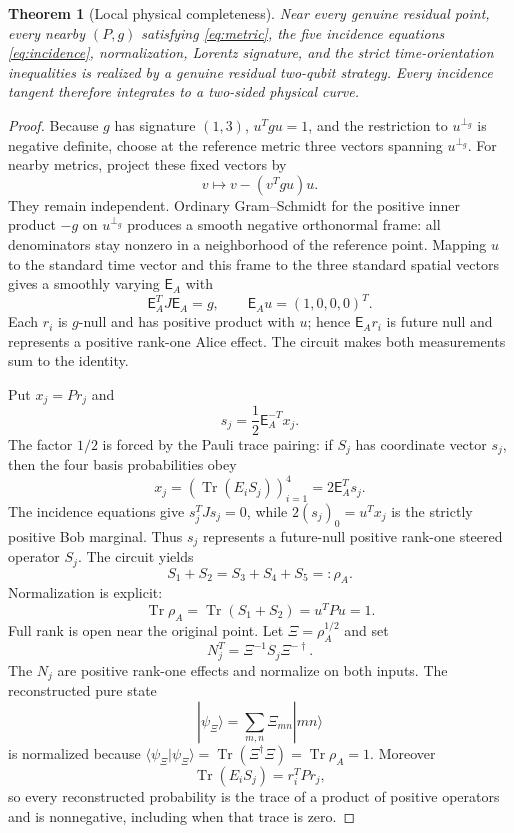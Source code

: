 \documentclass[11pt]{article}
\newtheorem{theorem}{Theorem}[section]
\theoremstyle{definition}
\newcommand{\Tr}{\operatorname{Tr}}
\begin{document}
\begin{theorem}[Local physical completeness]
\label{thm:physical-completeness}
Near every genuine residual point, every nearby \((P,g)\) satisfying
\eqref{eq:metric}, the five incidence equations \eqref{eq:incidence},
normalization, Lorentz signature, and the strict time-orientation inequalities
is realized by a genuine residual two-qubit strategy. Every incidence tangent
therefore integrates to a two-sided physical curve.
\end{theorem}

\begin{proof}
Because \(g\) has signature \((1,3)\), \(u^Tgu=1\), and the restriction to
\(u^{\perp_g}\) is negative definite, choose at the reference metric three
vectors spanning \(u^{\perp_g}\). For nearby metrics, project these fixed
vectors by
\[
v\longmapsto v-(v^Tgu)u.
\]
They remain independent. Ordinary Gram--Schmidt for the positive inner
product \(-g\) on \(u^{\perp_g}\) produces a smooth negative orthonormal frame:
all denominators stay nonzero in a neighborhood of the reference point.
Mapping \(u\) to the standard time vector and this frame to the three standard
spatial vectors gives a smoothly varying \(\mathsf E_A\) with
\[
\mathsf E_A^TJ\mathsf E_A=g,\qquad
\mathsf E_Au=(1,0,0,0)^T.
\]
Each \(r_i\) is \(g\)-null and has positive product with \(u\); hence
\(\mathsf E_A r_i\) is future null and represents a positive rank-one Alice
effect. The circuit makes both measurements sum to the identity.

Put \(x_j=Pr_j\) and
\[
s_j=\frac12\mathsf E_A^{-T}x_j.
\]
The factor \(1/2\) is forced by the Pauli trace pairing: if \(S_j\) has
coordinate vector \(s_j\), then the four basis probabilities obey
\[
x_j=(\Tr(E_iS_j))_{i=1}^4=2\mathsf E_A^Ts_j.
\]
The incidence equations give \(s_j^TJs_j=0\), while
\(2(s_j)_0=u^Tx_j\) is the strictly positive Bob marginal. Thus \(s_j\)
represents a future-null positive rank-one steered operator \(S_j\).
The circuit yields
\[
S_1+S_2=S_3+S_4+S_5=:\rho_A.
\]
Normalization is explicit:
\[
\Tr\rho_A=\Tr(S_1+S_2)
=u^TPu=1.
\]
Full rank is open near the original point. Let
\(\Xi=\rho_A^{1/2}\) and set
\[
N_j^T=\Xi^{-1}S_j\Xi^{-\dagger}.
\]
The \(N_j\) are positive rank-one effects and normalize on both inputs.
The reconstructed pure state
\[
|\psi_\Xi\rangle=\sum_{m,n}\Xi_{mn}|mn\rangle
\]
is normalized because
\(\langle\psi_\Xi|\psi_\Xi\rangle=\Tr(\Xi^\dagger\Xi)
=\Tr\rho_A=1\).
Moreover
\[
\Tr(E_iS_j)=r_i^TPr_j,
\]
so every reconstructed probability is the trace of a product of positive
operators and is nonnegative, including when that trace is zero.


\end{proof}
\end{document}

